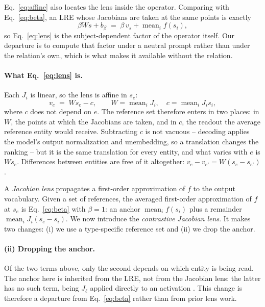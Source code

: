 Eq.~\ref{eq:affine} also locates the lens inside the operator. Comparing
with Eq.~\ref{eq:beta}, an LRE whose Jacobians are taken at the same
points is exactly
\begin{equation}
\beta W s + b_\beta \;=\; \beta\, v_s + \operatorname{mean}_i f(s_i) ,
\end{equation}
so Eq.~\ref{eq:lens} is the subject-dependent factor of the operator
itself. Our departure is to compute that factor under a neutral prompt
rather than under the relation's own, which is what makes it available
without the relation.

\paragraph{What Eq.~\ref{eq:lens} is.} Each $J_i$ is linear, so the lens
is affine in $s_e$:
\begin{equation}
v_e \;=\; W s_e - c, \qquad
W = \operatorname{mean}_i J_i, \quad c = \operatorname{mean}_i J_i s_i ,
\label{eq:affine}
\end{equation}
where $c$ does not depend on $e$. The reference set therefore enters in
two places: in $W$, the points at which the Jacobians are taken, and in
$c$, the readout the average reference entity would receive. Subtracting
$c$ is not vacuous -- decoding applies the model's output normalization
and unembedding, so a translation changes the ranking -- but it is the
same translation for every entity, and what varies with $e$ is $W s_e$.
Differences between entities are free of it altogether:
$v_e - v_{e'} = W(s_e - s_{e'})$.

A \emph{Jacobian lens} propagates a first-order approximation of $f$ to
the output vocabulary. Given a set of references, the averaged
first-order approximation of $f$ at $s_e$ is Eq.~\ref{eq:beta} with
$\beta=1$: an anchor $\operatorname{mean}_i f(s_i)$ plus a remainder
$\operatorname{mean}_i J_i (s_e - s_i)$.
We now introduce the \emph{contrastive Jacobian lens}. It
makes two changes: (i) we use a type-specific reference set and
(ii) we drop the anchor.

\paragraph{(ii) Dropping the anchor.} Of the two terms above, only the
second depends on which entity is being read. The anchor here is
inherited from the LRE, not from the Jacobian lens: the latter has no
such term, being $J_\ell$ applied directly to an activation
\citep{gurnee2026workspace}. This change is therefore a departure from
Eq.~\ref{eq:beta} rather than from prior lens work.

